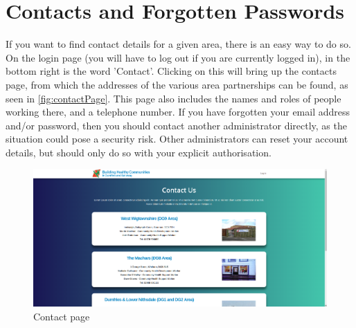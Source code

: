 \documentclass{bhcguides}
\begin{document}
\pagebreak

\section{Contacts and Forgotten Passwords}
\label{sec:contacts}

If you want to find contact details for a given area, there is an easy way to do so. On the login page (you will have to log out if you are currently logged in), in the bottom right is the word 'Contact'. Clicking on this will bring up the contacts page, from which the addresses of the various area partnerships can be found, as seen in \autoref{fig:contactPage}. This page also includes the names and roles of people working there, and a telephone number. If you have forgotten your email address and/or password, then you should contact another administrator directly, as the situation could pose a security risk. Other administrators can reset your account details, but should only do so with your explicit authorisation.

\begin{figure}[h]
 \centerline{\includegraphics[width=\textwidth, height=\textheight, keepaspectratio]{contactpage.png}}
 \caption{Contact page}
 \label{fig:contactPage}
\end{figure}
\end{document}
